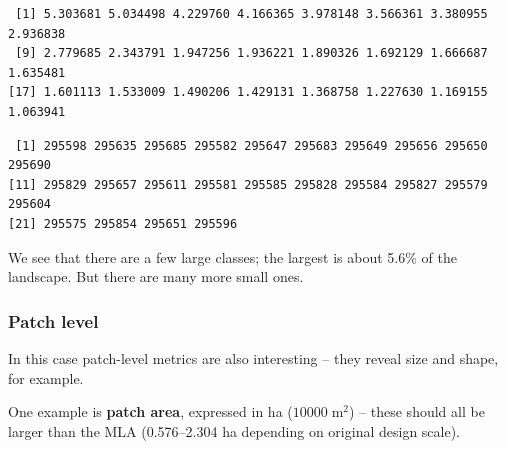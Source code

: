 \documentclass[
  letterpaper,
  DIV=11,
  numbers=noendperiod]{scrartcl}
\newenvironment{Shaded}{\begin{snugshade}}{\end{snugshade}}
\newcommand{\AttributeTok}[1]{\textcolor[rgb]{0.40,0.45,0.13}{#1}}
\newcommand{\CommentTok}[1]{\textcolor[rgb]{0.37,0.37,0.37}{#1}}
\newcommand{\ConstantTok}[1]{\textcolor[rgb]{0.56,0.35,0.01}{#1}}
\newcommand{\DecValTok}[1]{\textcolor[rgb]{0.68,0.00,0.00}{#1}}
\newcommand{\FloatTok}[1]{\textcolor[rgb]{0.68,0.00,0.00}{#1}}
\newcommand{\FunctionTok}[1]{\textcolor[rgb]{0.28,0.35,0.67}{#1}}
\newcommand{\NormalTok}[1]{\textcolor[rgb]{0.00,0.23,0.31}{#1}}
\newcommand{\OtherTok}[1]{\textcolor[rgb]{0.00,0.23,0.31}{#1}}
\newcommand{\SpecialCharTok}[1]{\textcolor[rgb]{0.37,0.37,0.37}{#1}}
\newcommand{\StringTok}[1]{\textcolor[rgb]{0.13,0.47,0.30}{#1}}
\begin{document}
\begin{verbatim}
 [1] 5.303681 5.034498 4.229760 4.166365 3.978148 3.566361 3.380955 2.936838
 [9] 2.779685 2.343791 1.947256 1.936221 1.890326 1.692129 1.666687 1.635481
[17] 1.601113 1.533009 1.490206 1.429131 1.368758 1.227630 1.169155 1.063941
\end{verbatim}

\begin{Shaded}
\end{Shaded}

\begin{verbatim}
 [1] 295598 295635 295685 295582 295647 295683 295649 295656 295650 295690
[11] 295829 295657 295611 295581 295585 295828 295584 295827 295579 295604
[21] 295575 295854 295651 295596
\end{verbatim}

We see that there are a few large classes; the largest is about 5.6\% of
the landscape. But there are many more small ones.

\hypertarget{patch-level}{%
\subsubsection{Patch level}\label{patch-level}}

In this case patch-level metrics are also interesting -- they reveal
size and shape, for example.

One example is \textbf{patch area}, expressed in ha
(\(10000 \; \mathrm{m}^2\)) -- these should all be larger than the MLA
(0.576--2.304 ha depending on original design scale).

\begin{Shaded}
\end{Shaded}
\end{document}
